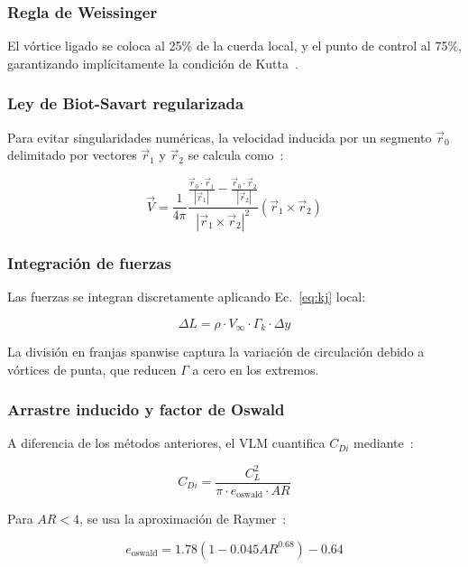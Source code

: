 \documentclass[twocolumn]{article}
\begin{document}
\subsubsection{Regla de Weissinger}
El vórtice ligado se coloca al 25\% de la cuerda local, y el punto de control al 75\%, garantizando implícitamente la condición de Kutta~\cite{weissinger1947}.

\subsubsection{Ley de Biot-Savart regularizada}
Para evitar singularidades numéricas, la velocidad inducida por un segmento $\vec{r}_0$ delimitado por vectores $\vec{r}_1$ y $\vec{r}_2$ se calcula como~\cite{katz2001}:

\begin{equation}
\vec{V} = \frac{1}{4\pi} \frac{\frac{\vec{r}_0 \cdot \vec{r}_1}{|\vec{r}_1|} - \frac{\vec{r}_0 \cdot \vec{r}_2}{|\vec{r}_2|}}{|\vec{r}_1 \times \vec{r}_2|^2} (\vec{r}_1 \times \vec{r}_2)
\end{equation}

\subsubsection{Integración de fuerzas}
Las fuerzas se integran discretamente aplicando Ec.~\eqref{eq:kj} local:

\begin{equation}
\Delta L = \rho \cdot V_{\infty} \cdot \Gamma_k \cdot \Delta y
\end{equation}

La división en franjas spanwise captura la variación de circulación debido a vórtices de punta, que reducen $\Gamma$ a cero en los extremos.

\subsubsection{Arrastre inducido y factor de Oswald}
A diferencia de los métodos anteriores, el VLM cuantifica $C_{Di}$ mediante~\cite{raymer2018}:

\begin{equation}
C_{Di} = \frac{C_L^2}{\pi \cdot e_{\text{oswald}} \cdot AR}
\label{eq:cdi}
\end{equation}

Para $AR < 4$, se usa la aproximación de Raymer~\cite{raymer2018}:

\begin{equation}
e_{\text{oswald}} = 1.78(1 - 0.045 AR^{0.68}) - 0.64
\end{equation}
\end{document}
